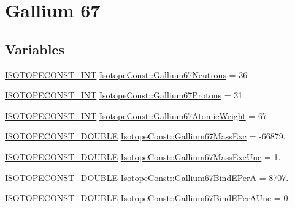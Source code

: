 \hypertarget{group___isotope_const-_gallium-_ga67}{}\section{Gallium 67}
\label{group___isotope_const-_gallium-_ga67}
\subsection*{Variables}
\begin{DoxyCompactItemize}
\item 
\mbox{\hyperlink{group___isotope_const-_macros_ga5f18360b3e99483a35c32d789e62621c}{I\+S\+O\+T\+O\+P\+E\+C\+O\+N\+S\+T\+\_\+\+I\+NT}} \mbox{\hyperlink{group___isotope_const-_gallium-_ga67_ga504b400de052e663906790dff832123d}{Isotope\+Const\+::\+Gallium67\+Neutrons}} = 36
\item 
\mbox{\hyperlink{group___isotope_const-_macros_ga5f18360b3e99483a35c32d789e62621c}{I\+S\+O\+T\+O\+P\+E\+C\+O\+N\+S\+T\+\_\+\+I\+NT}} \mbox{\hyperlink{group___isotope_const-_gallium-_ga67_gaa15d11328e74e5f681c8539f8b738256}{Isotope\+Const\+::\+Gallium67\+Protons}} = 31
\item 
\mbox{\hyperlink{group___isotope_const-_macros_ga5f18360b3e99483a35c32d789e62621c}{I\+S\+O\+T\+O\+P\+E\+C\+O\+N\+S\+T\+\_\+\+I\+NT}} \mbox{\hyperlink{group___isotope_const-_gallium-_ga67_ga77b9beb8aaa8a63bd0933b9461ef2abd}{Isotope\+Const\+::\+Gallium67\+Atomic\+Weight}} = 67
\item 
\mbox{\hyperlink{group___isotope_const-_macros_ga8f45a7272ce02c0b4c65c44636ed719a}{I\+S\+O\+T\+O\+P\+E\+C\+O\+N\+S\+T\+\_\+\+D\+O\+U\+B\+LE}} \mbox{\hyperlink{group___isotope_const-_gallium-_ga67_ga5b2efac1ef3eb1c65e4b448c6829d5fa}{Isotope\+Const\+::\+Gallium67\+Mass\+Exc}} = -\/66879.
\item 
\mbox{\hyperlink{group___isotope_const-_macros_ga8f45a7272ce02c0b4c65c44636ed719a}{I\+S\+O\+T\+O\+P\+E\+C\+O\+N\+S\+T\+\_\+\+D\+O\+U\+B\+LE}} \mbox{\hyperlink{group___isotope_const-_gallium-_ga67_gabef90762e74b044afbd214b29af442c8}{Isotope\+Const\+::\+Gallium67\+Mass\+Exc\+Unc}} = 1.
\item 
\mbox{\hyperlink{group___isotope_const-_macros_ga8f45a7272ce02c0b4c65c44636ed719a}{I\+S\+O\+T\+O\+P\+E\+C\+O\+N\+S\+T\+\_\+\+D\+O\+U\+B\+LE}} \mbox{\hyperlink{group___isotope_const-_gallium-_ga67_gaf4c390a88224829ed255075d2a66441a}{Isotope\+Const\+::\+Gallium67\+Bind\+E\+PerA}} = 8707.
\item 
\mbox{\hyperlink{group___isotope_const-_macros_ga8f45a7272ce02c0b4c65c44636ed719a}{I\+S\+O\+T\+O\+P\+E\+C\+O\+N\+S\+T\+\_\+\+D\+O\+U\+B\+LE}} \mbox{\hyperlink{group___isotope_const-_gallium-_ga67_ga1763547d2c298477b6e9a4ff47799698}{Isotope\+Const\+::\+Gallium67\+Bind\+E\+Per\+A\+Unc}} = 0.

\end{DoxyCompactItemize}
